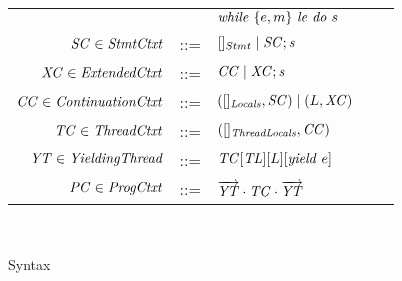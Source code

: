 \begin{figure}
\begin{tabular}{rclcl}
                  & & $\mathit{while}\ \{{e,m}\}\ {{\mathit{le}}\ } \mathit{do}\ {{s}\ }$ \\ 
$\mathit{SC} \in \mathit{StmtCtxt}$ &::= &$[]_{Stmt} \mid \mathit{SC};\mathit{s}$ \\
$\mathit{XC} \in \mathit{ExtendedCtxt}$ &::= & $\mathit{CC} \mid \mathit{XC};\mathit{s}$ \\
$\mathit{CC} \in \mathit{ContinuationCtxt}$ &::= & $([]_{\mathit{Locals}}, \mathit{SC}) \mid (L,\mathit{XC})$ \\
$\mathit{TC} \in \mathit{ThreadCtxt}$ &::= &$([]_{\mathit{ThreadLocals}}, \mathit{CC})$ \\
$\mathit{YT} \in \mathit{YieldingThread}$ &::= &$\mathit{TC}[\mathit{TL}][L][\mathit{yield}\ e]$ \\
$\mathit{PC} \in \mathit{ProgCtxt}$ &::= &$\overrightarrow{\mathit{YT}} \cdot \mathit{TC} \cdot \overrightarrow{\mathit{YT}}$ \\
\end{tabular}\\
\setlength{\tabcolsep}{6pt}
\caption{Syntax}
\label{fig:syntax}
\end{figure}

